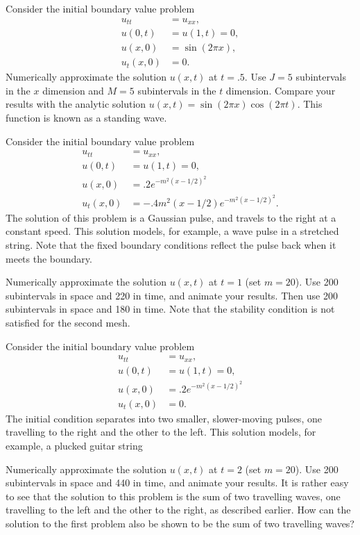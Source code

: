 \begin{problem}
Consider the initial boundary value problem 
\begin{align*}
	u_{tt} &= u_{xx}, \\
	u(0,t) &= u(1,t) = 0, \\
	u(x,0) &= \sin(2 \pi x),\\ 
	u_t(x,0) &= 0.
\end{align*}
Numerically approximate the solution $u(x,t)$ at $t = .5$.
Use $J=5$ subintervals in the $x$ dimension and $M=5$ subintervals in the $t$ dimension.
Compare your results with the analytic solution $u(x,t) = \sin{(2 \pi x)} \cos{(2 \pi t)}.$
This function is known as a standing wave.
\end{problem}

\begin{problem}
Consider the initial boundary value problem 
\begin{align*}
	u_{tt} &= u_{xx}, \\
	u(0,t) &= u(1,t) = 0, \\
	u(x,0) &= .2e^{-m^2(x-1/2)^2}\\ 
	u_t(x,0) &= -.4m^2(x-1/2)e^{-m^2(x-1/2)^2}.
\end{align*}
The solution of this problem is a Gaussian pulse, and travels to the right at a constant speed.
This solution models, for example, a wave pulse in a stretched string.
Note that the fixed boundary conditions reflect the pulse back when it meets the boundary.

Numerically approximate the solution $u(x,t)$ at $t = 1$ (set $m=20$).
Use 200 subintervals in space and 220 in time, and animate your results.
Then use 200 subintervals in space and 180 in time.
Note that the stability condition is not satisfied for the second mesh.
\end{problem}

\begin{problem}
Consider the initial boundary value problem 
\begin{align*}
	u_{tt} &= u_{xx}, \\
	u(0,t) &= u(1,t) = 0, \\
	u(x,0) &= .2e^{-m^2(x-1/2)^2}\\ 
	u_t(x,0) &= 0.
\end{align*}
The initial condition separates into two smaller, slower-moving pulses, one travelling to the right and the other to the left.
This solution models, for example, a plucked guitar string

Numerically approximate the solution $u(x,t)$ at $t = 2$ (set $m=20$).
Use 200 subintervals in space and 440 in time, and animate your results.
It is rather easy to see that the solution to this problem is the sum of two travelling waves, one travelling to the left and the other to the right, as described earlier.
How can the solution to the first problem also be shown to be the sum of two travelling waves? 
\end{problem}

